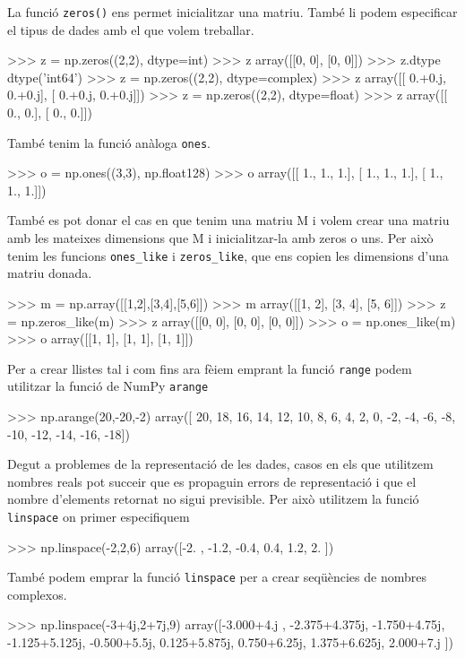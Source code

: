 La funció {\tt zeros()} ens permet inicialitzar una matriu. També li podem especificar el tipus de dades amb el que volem treballar.
\begin{tip}[caption=Inicialització amb funcio zeros()]
>>> z = np.zeros((2,2), dtype=int)
>>> z
array([[0, 0],
       [0, 0]])
>>> z.dtype
dtype('int64')
>>> z = np.zeros((2,2), dtype=complex)
>>> z
array([[ 0.+0.j,  0.+0.j],
       [ 0.+0.j,  0.+0.j]])
>>> z = np.zeros((2,2), dtype=float)
>>> z
array([[ 0.,  0.],
       [ 0.,  0.]])
\end{tip}
També tenim la funció anàloga {\tt ones}.
\begin{tip}[caption=Inicialització amb funcio ones()]
>>> o = np.ones((3,3), np.float128)
>>> o
array([[ 1.,  1.,  1.],
       [ 1.,  1.,  1.],
       [ 1.,  1.,  1.]])
\end{tip}
També es pot donar el cas en que tenim una matriu M i volem crear una matriu amb les mateixes dimensions que M i inicialitzar-la amb zeros o uns. Per això tenim les funcions {\tt ones\_like} i {\tt zeros\_like}, que ens copien les dimensions d'una matriu donada.
\begin{tip}[caption=Zeros like i ones like]
>>> m = np.array([[1,2],[3,4],[5,6]])
>>> m
array([[1, 2],
       [3, 4],
       [5, 6]])
>>> z = np.zeros_like(m)
>>> z
array([[0, 0],
       [0, 0],
       [0, 0]])
>>> o = np.ones_like(m)
>>> o
array([[1, 1],
       [1, 1],
       [1, 1]])
\end{tip}
Per a crear llistes tal i com fins ara fèiem emprant la funció {\tt range} podem utilitzar la funció  de NumPy {\tt arange}
\begin{blockcode}
>>> np.arange(20,-20,-2)
array([ 20,  18,  16,  14,  12,  10,   8,   6,   4,   2,   
0,  -2,  -4,  -6,  -8, -10, -12, -14, -16, -18])
\end{blockcode}
Degut a problemes de la representació de les dades, casos en els que utilitzem nombres reals pot succeir que es propaguin errors de representació i que el nombre d'elements retornat no sigui previsible. Per això utilitzem la funció {\tt linspace} on primer especifiquem
\begin{blockcode}
>>> np.linspace(-2,2,6)
array([-2. , -1.2, -0.4,  0.4,  1.2,  2. ])
\end{blockcode}
També podem emprar la funció {\tt linspace} per a crear seqüències de nombres complexos.
\begin{blockcode}
>>> np.linspace(-3+4j,2+7j,9)
array([-3.000+4.j , -2.375+4.375j, -1.750+4.75j, -1.125+5.125j,
       -0.500+5.5j,  0.125+5.875j,  0.750+6.25j,  1.375+6.625j,
        2.000+7.j   ])
\end{blockcode}
